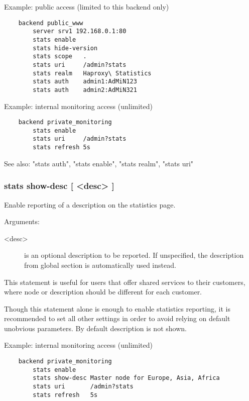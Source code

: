   Example: public access (limited to this backend only)
  \begin{verbatim}
    backend public_www
        server srv1 192.168.0.1:80
        stats enable
        stats hide-version
        stats scope   .
        stats uri     /admin?stats
        stats realm   Haproxy\ Statistics
        stats auth    admin1:AdMiN123
        stats auth    admin2:AdMiN321
  \end{verbatim}

  Example: internal monitoring access (unlimited)
  \begin{verbatim}
    backend private_monitoring
        stats enable
        stats uri     /admin?stats
        stats refresh 5s
  \end{verbatim}

  See also: "stats auth", "stats enable", "stats realm", "stats uri"

\subsubsection[stats show-desc]{stats show-desc [ <desc> ]}


  Enable reporting of a description on the statistics page.


   Arguments:
   \begin{description}
    \item[<desc>]    is an optional description to be reported. If unspecified, the
              description from global section is automatically used instead.
   \end{description}

  This statement is useful for users that offer shared services to their
  customers, where node or description should be different for each customer.

  Though this statement alone is enough to enable statistics reporting, it is
  recommended to set all other settings in order to avoid relying on default
  unobvious parameters.  By default description is not shown.

  Example: internal monitoring access (unlimited)
  \begin{verbatim}
    backend private_monitoring
        stats enable
        stats show-desc Master node for Europe, Asia, Africa
        stats uri       /admin?stats
        stats refresh   5s
  \end{verbatim}

